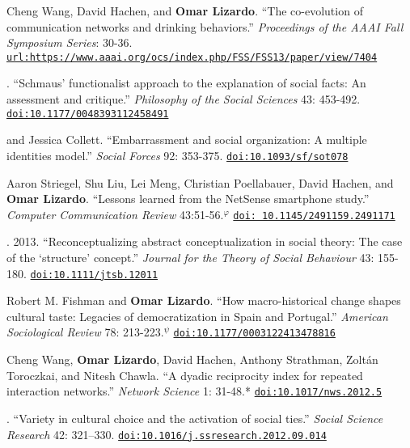 
\ind Cheng Wang, David Hachen, and {\bf Omar Lizardo}. ``The co-evolution of communication networks and drinking behaviors.''  {\em Proceedings of the AAAI Fall Symposium Series}: 30-36. \href{https://www.aaai.org/ocs/index.php/FSS/FSS13/paper/view/7404}{\nolinkurl{url:https://www.aaai.org/ocs/index.php/FSS/FSS13/paper/view/7404}}

.  ``Schmaus' functionalist approach to the explanation of social facts: An assessment and critique.''  {\em Philosophy of the Social Sciences} 43: 453-492. \href{https://doi.org/10.1177/0048393112458491}{\nolinkurl{doi:10.1177/0048393112458491}} 

 and Jessica Collett. ``Embarrassment and social organization: A multiple identities model.'' {\em Social Forces} 92: 353-375.  \href{https://doi.org/10.1093/sf/sot078}{\nolinkurl{doi:10.1093/sf/sot078}}

\ind Aaron Striegel, Shu Liu, Lei Meng, Christian Poellabauer, David Hachen, and {\bf Omar Lizardo}. ``Lessons learned from the NetSense smartphone study.'' {\em Computer Communication Review} 43:51-56.\textcolor{black}{$^{\varphi}$}  \href{https://doi.org/ 10.1145/2491159.2491171}{\nolinkurl{doi: 10.1145/2491159.2491171}}

. 2013. ``Reconceptualizing abstract conceptualization in social theory: The case of the ‘structure’ concept.'' {\em Journal for the Theory of Social Behaviour} 43: 155-180. \href{https://doi.org/10.1111/jtsb.12011}{\nolinkurl{doi:10.1111/jtsb.12011}} 

\ind Robert M. Fishman and {\bf Omar Lizardo}. ``How macro-historical change shapes cultural taste: Legacies of democratization in Spain and Portugal.'' {\em American Sociological Review} 78: 213-223.\textcolor{black}{$^{\psi}$} \href{https://doi.org/10.1177/0003122413478816}{\nolinkurl{doi:10.1177/0003122413478816}}

\ind Cheng Wang, {\bf Omar Lizardo}, David Hachen, Anthony Strathman, Zolt\'{a}n Toroczkai, and Nitesh Chawla. ``A dyadic reciprocity index for repeated interaction networks.'' {\em Network Science} 1: 31-48.\textcolor{uclablue}{*} \href{https://doi.org/10.1017/nws.2012.5}{\nolinkurl{doi:10.1017/nws.2012.5}}

. ``Variety in cultural choice and the activation of social ties.'' {\em Social Science Research} 42: 321–330. \href{https://doi.org/10.1016/j.ssresearch.2012.09.014}{\nolinkurl{doi:10.1016/j.ssresearch.2012.09.014}}